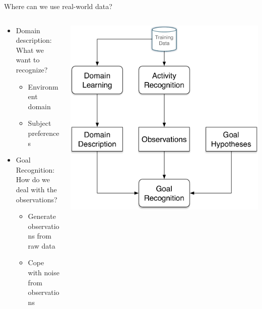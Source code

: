 \documentclass[usenames,dvipsnames]{beamer}
\begin{document}
\begin{frame}[c]{Where can we use real-world data?}
	\begin{columns}
		\begin{column}{0.5\textwidth}
			\begin{itemize}
				\item Domain description: \\What we want to recognize?
				\begin{itemize}
					\item Environment domain
					\item Subject preferences
				\end{itemize}
				\item Goal Recognition: \\How do we deal with the observations?
				\begin{itemize}
					\item Generate observations from raw data
					\item Cope with noise from observations
				\end{itemize}
			\end{itemize}
		\end{column}
		\begin{column}{0.5\textwidth}
			\includegraphics[width=.9\textwidth]{fig/gr-learning.pdf}	
		\end{column}
	\end{columns}
\end{frame}
\end{document}
